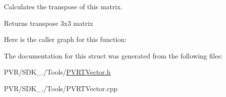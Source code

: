 Calculates the transpose of this matrix. 





\begin{DoxyReturn}{Returns}
transpose 3x3 matrix 
\end{DoxyReturn}


Here is the caller graph for this function\+:




The documentation for this struct was generated from the following files\+:\begin{DoxyCompactItemize}
\item 
P\+V\+R/\+S\+D\+K\+\_./\+Tools/\hyperlink{_p_v_r_t_vector_8h}{P\+V\+R\+T\+Vector.\+h}\item 
P\+V\+R/\+S\+D\+K\+\_./\+Tools/P\+V\+R\+T\+Vector.\+cpp\end{DoxyCompactItemize}
